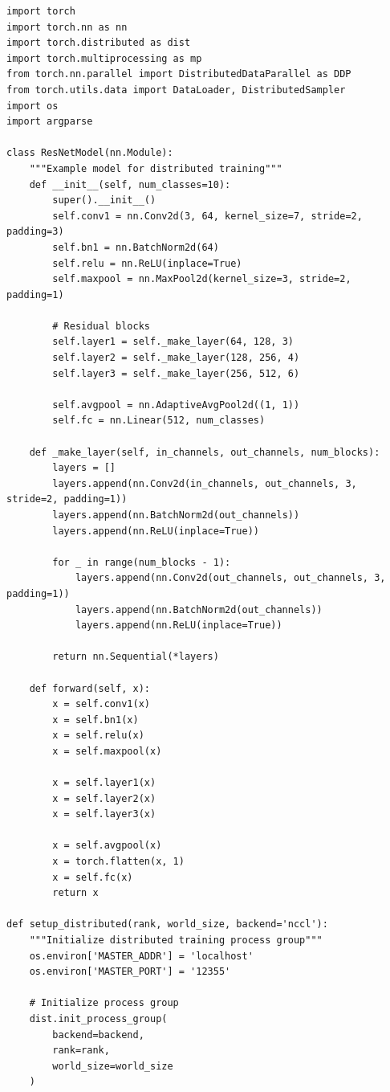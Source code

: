 \begin{lstlisting}[style=python, caption=Complete PyTorch DDP implementation]
import torch
import torch.nn as nn
import torch.distributed as dist
import torch.multiprocessing as mp
from torch.nn.parallel import DistributedDataParallel as DDP
from torch.utils.data import DataLoader, DistributedSampler
import os
import argparse

class ResNetModel(nn.Module):
    """Example model for distributed training"""
    def __init__(self, num_classes=10):
        super().__init__()
        self.conv1 = nn.Conv2d(3, 64, kernel_size=7, stride=2, padding=3)
        self.bn1 = nn.BatchNorm2d(64)
        self.relu = nn.ReLU(inplace=True)
        self.maxpool = nn.MaxPool2d(kernel_size=3, stride=2, padding=1)

        # Residual blocks
        self.layer1 = self._make_layer(64, 128, 3)
        self.layer2 = self._make_layer(128, 256, 4)
        self.layer3 = self._make_layer(256, 512, 6)

        self.avgpool = nn.AdaptiveAvgPool2d((1, 1))
        self.fc = nn.Linear(512, num_classes)

    def _make_layer(self, in_channels, out_channels, num_blocks):
        layers = []
        layers.append(nn.Conv2d(in_channels, out_channels, 3, stride=2, padding=1))
        layers.append(nn.BatchNorm2d(out_channels))
        layers.append(nn.ReLU(inplace=True))

        for _ in range(num_blocks - 1):
            layers.append(nn.Conv2d(out_channels, out_channels, 3, padding=1))
            layers.append(nn.BatchNorm2d(out_channels))
            layers.append(nn.ReLU(inplace=True))

        return nn.Sequential(*layers)

    def forward(self, x):
        x = self.conv1(x)
        x = self.bn1(x)
        x = self.relu(x)
        x = self.maxpool(x)

        x = self.layer1(x)
        x = self.layer2(x)
        x = self.layer3(x)

        x = self.avgpool(x)
        x = torch.flatten(x, 1)
        x = self.fc(x)
        return x

def setup_distributed(rank, world_size, backend='nccl'):
    """Initialize distributed training process group"""
    os.environ['MASTER_ADDR'] = 'localhost'
    os.environ['MASTER_PORT'] = '12355'

    # Initialize process group
    dist.init_process_group(
        backend=backend,
        rank=rank,
        world_size=world_size
    )


\end{lstlisting}
